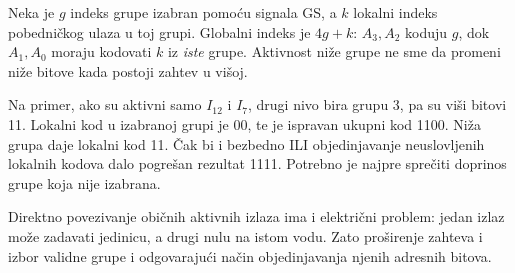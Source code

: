 
Neka je \(g\) indeks grupe izabran pomoću signala GS, a \(k\) lokalni indeks pobedničkog ulaza u toj grupi. Globalni indeks je \(4g+k\): \(A_3,A_2\) koduju \(g\), dok \(A_1,A_0\) moraju kodovati \(k\) iz \emph{iste} grupe. Aktivnost niže grupe ne sme da promeni niže bitove kada postoji zahtev u višoj.

Na primer, ako su aktivni samo \(I_{12}\) i \(I_7\), drugi nivo bira grupu 3, pa su viši bitovi 11. Lokalni kod u izabranoj grupi je 00, te je ispravan ukupni kod 1100. Niža grupa daje lokalni kod 11. Čak bi i bezbedno ILI objedinjavanje neuslovljenih lokalnih kodova dalo pogrešan rezultat 1111. Potrebno je najpre sprečiti doprinos grupe koja nije izabrana.

Direktno povezivanje običnih aktivnih izlaza ima i električni problem: jedan izlaz može zadavati jedinicu, a drugi nulu na istom vodu. Zato proširenje zahteva i izbor validne grupe i odgovarajući način objedinjavanja njenih adresnih bitova.
